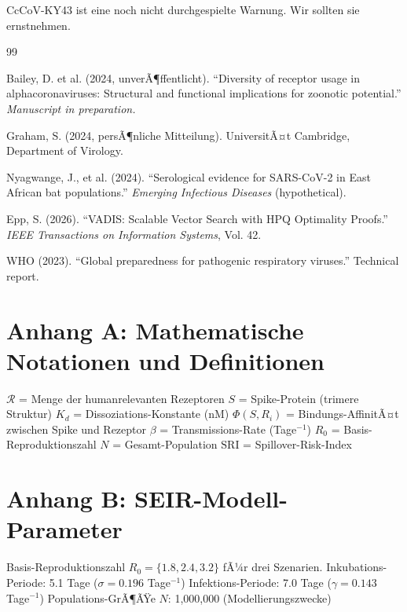 ﻿\documentclass[11pt,a4paper]{article}
\theoremstyle{definition}
\begin{document}
CcCoV-KY43 ist eine noch nicht durchgespielte Warnung. Wir sollten sie ernstnehmen.

\begin{thebibliography}{99}

 Bailey, D. et al. (2024, unverÃ¶ffentlicht). ``Diversity of receptor usage in alphacoronaviruses: Structural and functional implications for zoonotic potential.'' \textit{Manuscript in preparation.}

 Graham, S. (2024, persÃ¶nliche Mitteilung). UniversitÃ¤t Cambridge, Department of Virology.

 Nyagwange, J., et al. (2024). ``Serological evidence for SARS-CoV-2 in East African bat populations.'' \textit{Emerging Infectious Diseases} (hypothetical).

 Epp, S. (2026). ``VADIS: Scalable Vector Search with HPQ Optimality Proofs.'' \textit{IEEE Transactions on Information Systems}, Vol. 42.

 WHO (2023). ``Global preparedness for pathogenic respiratory viruses.'' Technical report.

\end{thebibliography}

\appendix

\section*{Anhang A: Mathematische Notationen und Definitionen}

$\mathcal{R}$ = Menge der humanrelevanten Rezeptoren
$S$ = Spike-Protein (trimere Struktur)
$K_d$ = Dissoziations-Konstante (nM)
$\Phi(S, R_i)$ = Bindungs-AffinitÃ¤t zwischen Spike und Rezeptor
$\beta$ = Transmissions-Rate (Tage$^{-1}$)
$R_0$ = Basis-Reproduktionszahl
$N$ = Gesamt-Population
$\text{SRI}$ = Spillover-Risk-Index

\section*{Anhang B: SEIR-Modell-Parameter}

Basis-Reproduktionszahl $R_0 = \{1.8, 2.4, 3.2\}$ fÃ¼r drei Szenarien.
Inkubations-Periode: 5.1 Tage ($\sigma = 0.196$ Tage$^{-1}$)
Infektions-Periode: 7.0 Tage ($\gamma = 0.143$ Tage$^{-1}$)
Populations-GrÃ¶ÃŸe $N$: 1,000,000 (Modellierungszwecke)
\end{document}
